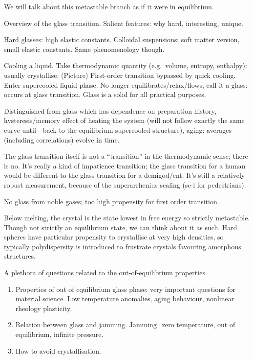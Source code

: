We will talk about this metastable branch as if it were in equilibrium.

Overview of the glass transition.
Salient features: why hard, interesting, unique.

Hard glasses: high elastic constants.
Colloidal suspensions: soft matter version, small elastic constants.
Same phenomenology though.

Cooling a liquid.
Take thermodynamic quantity (e.g.\ volume, entropy, enthalpy): usually crystallise.
(Picture)
First-order transition bypassed by quick cooling.
Enter supercooled liquid phase.
No longer equilibrates/relax/flows, call it a glass: occurs at glass transition.
Glass is a solid for all practical purposes.

Distinguished from glass which has dependence on preparation history, hysteresis/memory effect of heating the system (will not follow exactly the same curve until - back to the equilibrium supercooled structure), aging: averages (including correlations) evolve in time.

The glass transition itself is not a ``transition'' in the thermodynamic sense; there is no.
It's really a kind of impatience transition; the glass transition for a human would be different to the glass transition for a demigod/ent.
It's still a relatively robust measurement, because of the superarrhenius scaling (sc-l for pedestrians).

No glass from noble gases; too high propensity for first order transition.

Below melting, the crystal is the state lowest in free energy so strictly metastable.
Though not strictly an equilibrium state, we can think about it as such.
Hard spheres have particular propensity to crystallise at very high densities, so typically polydispersity is introduced to frustrate crystals favouring amorphous structures.

A plethora of questions related to the out-of-equilibrium properties.
\begin{enumerate}
\item Properties of out of equilibrium glass phase: very important questions for material science. Low temperature anomalies, aging behaviour, nonlinear rheology  plasticity.
\item Relation between glass and jamming. Jamming=zero temperature, out of equilibrium, infinite pressure.
\item How to avoid crystallisation.
\end{enumerate}

